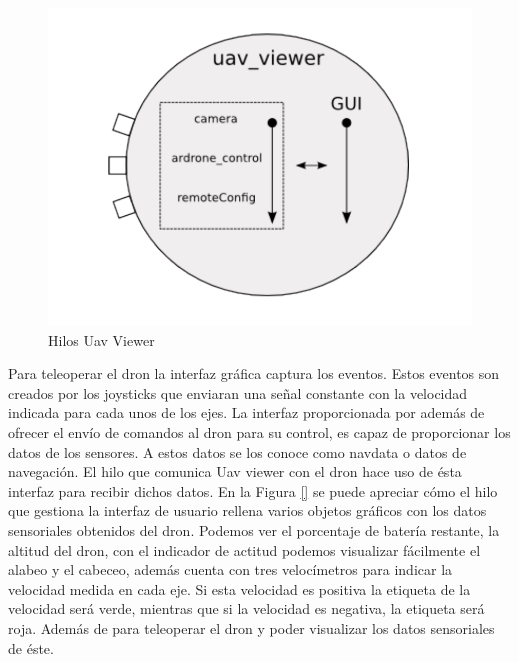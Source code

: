 \begin{figure}[H]
  \centering
  \includegraphics[scale=0.3]{imagenes/uavViewer.png}
  \caption{Hilos Uav Viewer}
  \label{fig:uavViewer}
\end{figure}

Para teleoperar el dron la interfaz gráfica captura los eventos. Estos eventos son creados por los joysticks que enviaran una señal constante con la velocidad indicada para cada unos de los ejes. La interfaz proporcionada por además de ofrecer el envío de
comandos al dron para su control, es capaz de proporcionar los datos de los sensores. A estos datos se los conoce como navdata o datos de navegación. El hilo que comunica Uav viewer con el dron hace uso de ésta interfaz para recibir dichos datos. En la Figura \ref{} se puede apreciar cómo el hilo que gestiona la interfaz de usuario rellena varios objetos gráficos con los datos sensoriales obtenidos del dron. Podemos ver el porcentaje de batería restante, la altitud del dron, con el indicador de actitud podemos visualizar fácilmente el alabeo y el cabeceo, además cuenta con tres velocímetros para indicar la velocidad medida en cada eje. Si esta velocidad es positiva la etiqueta de la velocidad será verde, mientras que si la velocidad es negativa, la etiqueta será roja.
Además de para teleoperar el dron y poder visualizar los datos sensoriales de éste.

